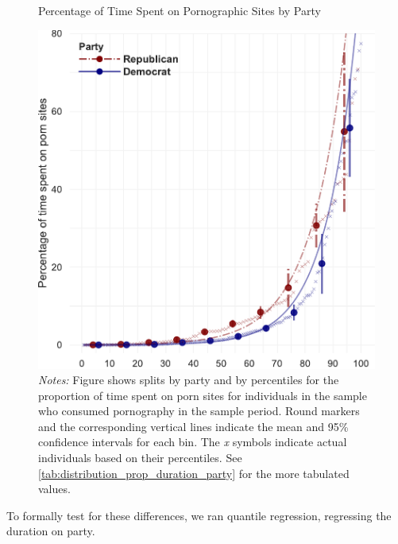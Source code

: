 \documentclass[12pt, letterpaper]{article}
\begin{document}
\begin{figure}[ht]
	\centering
	\caption{Percentage of Time Spent on Pornographic Sites by Party}
	\includegraphics[width=.6\linewidth]{../figs/distribution_proportion_duration_on_adultsites_by_party.pdf}
	\caption*{\footnotesize \emph{Notes:} 
		Figure shows splits by party and by percentiles for the proportion of time spent on porn sites for individuals in the sample who consumed pornography in the sample period.
		Round markers and the corresponding vertical lines indicate the mean and 95\% confidence intervals for each bin.
		The \emph{x} symbols indicate actual individuals based on their percentiles.
		See \cref{tab:distribution_prop_duration_party} for the more tabulated values.
	}
	\label{fig:distribution_prop_duration_party}
\end{figure}


\newpage


To formally test for these differences, we ran quantile regression, regressing the duration on party. 
\end{document}
